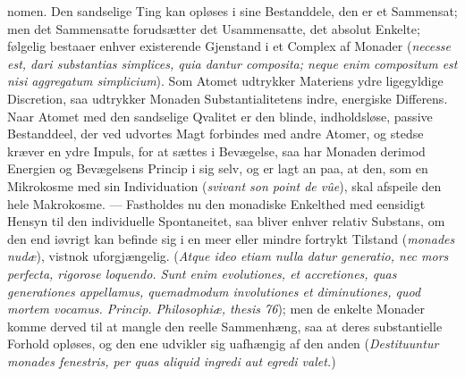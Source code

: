 \documentclass[12pt]{book}
\begin{document}
nomen. Den sandselige Ting kan opløses i sine Bestanddele, den er et Sammensat; men
det Sammensatte forudsætter det Usammensatte, det absolut Enkelte; følgelig bestaaer
enhver existerende Gjenstand i et Complex af Monader (\textit{necesse est, dari
substantias simplices, quia dantur composita; neque enim compositum est nisi
aggregatum simplicium}). Som Atomet udtrykker Materiens ydre ligegyldige Discretion,
saa udtrykker Monaden Substantialitetens indre, energiske Differens. Naar Atomet med
den sandselige Qvalitet er den blinde, indholdsløse, passive Bestanddeel, der ved
udvortes Magt forbindes med andre Atomer, og stedse kræver en ydre Impuls, for at
sættes i Bevægelse, saa har Monaden derimod Energien og Bevægelsens Princip i sig selv,
og er lagt an paa, at den, som en Mikrokosme med sin Individuation
(\textit{svivant son point de vûe}),
skal afspeile den hele Makrokosme. --- Fastholdes nu den monadiske Enkelthed med
eensidigt Hensyn til den individuelle Spontaneitet, saa bliver enhver relativ Substans,
om den end iøvrigt kan befinde sig i en meer eller mindre fortrykt Tilstand
(\textit{monades nudæ}), vistnok uforgjængelig. (\textit{Atque ideo etiam nulla datur
generatio, nec mors perfecta, rigorose loquendo. Sunt enim evolutiones, et accretiones,
quas generationes appellamus, quemadmodum involutiones et diminutiones, quod mortem
vocamus. Princip. Philosophiæ, thesis 76}); men de enkelte Monader komme derved til at
mangle den reelle Sammenhæng, saa at deres substantielle Forhold opløses, og den ene
udvikler sig uafhængig af den anden (\textit{Destituuntur monades fenestris, per quas
aliquid ingredi aut egredi valet.})
\end{document}
